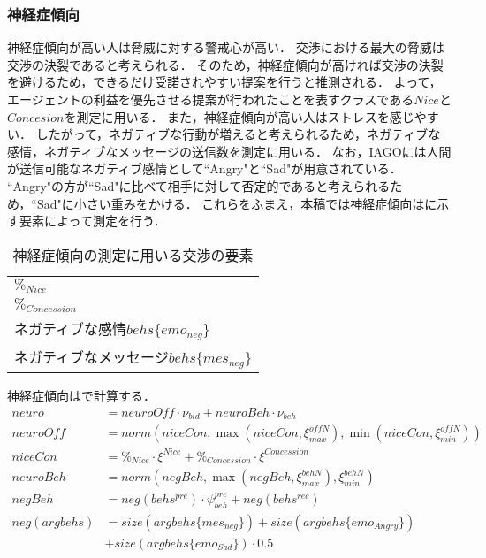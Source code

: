 \subsubsection*{神経症傾向}
神経症傾向が高い人は脅威に対する警戒心が高い．
交渉における最大の脅威は交渉の決裂であると考えられる．
そのため，神経症傾向が高ければ交渉の決裂を避けるため，できるだけ受諾されやすい提案を行うと推測される．
よって，エージェントの利益を優先させる提案が行われたことを表すクラスである$Nice$と$Concesion$を測定に用いる．
また，神経症傾向が高い人はストレスを感じやすい．
したがって，ネガティブな行動が増えると考えられるため，ネガティブな感情，ネガティブなメッセージの送信数を測定に用いる．
なお，IAGOには人間が送信可能なネガティブ感情として``Angry"と``Sad"が用意されている．
``Angry"の方が``Sad"に比べて相手に対して否定的であると考えられるため，``Sad"に小さい重みをかける．
これらをふまえ，本稿では神経症傾向はに示す要素によって測定を行う．

\begin{table}[tb]
    \centering
    \caption{神経症傾向の測定に用いる交渉の要素}
    \begin{tabular}{l} \toprule
        $\%_{Nice}$ \\
        $\%_{Concession}$ \\
        ネガティブな感情$behs\{emo_{neg}\}$ \\
        ネガティブなメッセージ$behs\{mes_{neg}\}$ \\ \bottomrule
    \end{tabular}
    \label{tab:neuroticism}
\end{table}

神経症傾向はで計算する．
\begin{align}
    neuro &= \mathit{neuroOff} \cdot \nu_{\mathit{bid}} + neuroBeh \cdot \nu_{beh} \label{eq:neuroticism} \\
    \mathit{neuroOff} &= norm\left(niceCon, \max \left( niceCon, \xi_{max}^{\mathit{offN}}\right) , \min \left(niceCon, \xi_{min}^{\mathit{offN}}\right) \right) \nonumber \\
    niceCon &= \%_{Nice} \cdot \xi^{\mathit{Nice}} + \%_{Concession} \cdot \xi^{\mathit{Concession}} \nonumber \\
    neuroBeh &= norm\left( negBeh, \max \left( negBeh, \xi_{max}^{\mathit{behN}}\right), \xi_{min}^{\mathit{behN}} \right) \nonumber \\
    negBeh &=  neg(behs^{pre}) \cdot \psi_{beh}^{pre} + neg(behs^{rec}) \nonumber \\
    neg(argbehs) &= size(argbehs\{mes_{neg}\}) + size(argbehs\{emo_{Angry}\}) \nonumber \\
    &+ size(argbehs\{emo_{Sad}\}) \cdot 0.5 \nonumber 
\end{align}

